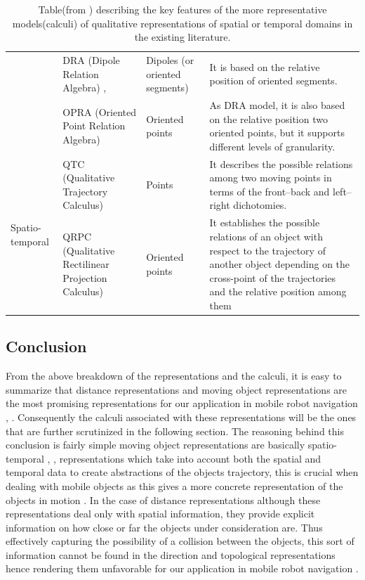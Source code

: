 \begin{table}[h!]
\begin{adjustwidth}{-2cm}{}
{\begin{tabular}{|p{3cm}|p{4cm}|p{3cm}|p{8cm}|}
						& DRA (Dipole Relation Algebra)  \cite{dylla2004empirical}, \cite{dylla2004exploiting} & Dipoles (or oriented segments) & It is based on the relative position of oriented segments. \\ \cline{2-4} 
						& OPRA (Oriented Point Relation Algebra)  \cite{dylla2006generalizing} & Oriented points & As DRA model, it is also based on the relative position two oriented points, but it supports different levels of granularity. \\ \hline
						\multirow{2}{*}{Spatio-temporal} & QTC (Qualitative Trajectory Calculus)  \cite{van2005representing} & Points & It describes the possible relations among two moving points in terms of the front–back and left–right dichotomies. \\ \cline{2-4} 
						& QRPC (Qualitative Rectilinear Projection Calculus)  \cite{glez2013qrpc} & Oriented points & It establishes the possible relations of an object with respect to the trajectory of another object depending on the cross-point of the trajectories and the relative position among them \\ \hline
				\end{tabular}}
			\caption{Table(from \cite{glez2013qrpc}) describing the key features of the more representative models(calculi) of qualitative representations of spatial or temporal domains in the existing literature.}
			\end{adjustwidth}
		\end{table}
	
			\newpage
	
		\subsection{Conclusion}From the above breakdown of the representations and the calculi, it is easy to summarize that distance representations and moving object representations are the most promising representations for our application in mobile robot navigation \cite{chen2015survey}, \cite{cohn1997qualitative}. Consequently the calculi associated with these representations will be the ones that are further scrutinized in the following section. The reasoning behind this conclusion is fairly simple moving object representations are basically spatio-temporal \cite{cohn2001qualitative}, \cite{cohn2008qualitative}, \cite{Yan2012QualitativeRA} representations which take into account both the spatial and temporal data to create abstractions of the objects trajectory, this is crucial when dealing with mobile objects as this gives a more concrete representation of the objects in motion \cite{glez2013qrpc}. In the case of distance representations although these representations deal only with spatial information, they provide explicit information on how close or far the objects under consideration are. Thus effectively capturing the possibility of a collision between the objects, this sort of information cannot be found in the direction and topological representations hence rendering them unfavorable for our application in mobile robot navigation  .
	
